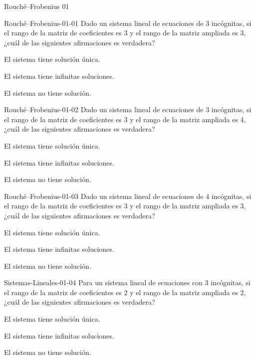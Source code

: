 \documentclass[a4,11pt]{aleph-notas}
\begin{document}
\begin{quiz}{Rouché–Frobenius 01}

\begin{multi}[]%
    {Rouché–Frobenius-01-01}
    Dado un sistema lineal de ecuaciones de 3 incógnitas, si el rango de la matriz de coeficientes es 3 y el rango de la matriz ampliada es 3, ¿cuál de las siguientes afirmaciones es verdadera?
    \item* El sistema tiene solución única.
    \item El sistema tiene infinitas soluciones.
    \item El sistema no tiene solución.
\end{multi}

\begin{multi}[]%
    {Rouché–Frobenius-01-02}
    Dado un sistema lineal de ecuaciones de 3 incógnitas, si el rango de la matriz de coeficientes es 3 y el rango de la matriz ampliada es 4, ¿cuál de las siguientes afirmaciones es verdadera?
    \item El sistema tiene solución única.
    \item El sistema tiene infinitas soluciones.
    \item* El sistema no tiene solución.
\end{multi}

\begin{multi}[]%
    {Rouché–Frobenius-01-03}
    Dado un sistema lineal de ecuaciones de 4 incógnitas, si el rango de la matriz de coeficientes es 3 y el rango de la matriz ampliada es 3, ¿cuál de las siguientes afirmaciones es verdadera?
    \item El sistema tiene solución única.
    \item* El sistema tiene infinitas soluciones.
    \item El sistema no tiene solución.
\end{multi}

\begin{multi}[]%
    {Sistemas-Lineales-01-04}
    Para un sistema lineal de ecuaciones con 3 incógnitas, si el rango de la matriz de coeficientes es 2 y el rango de la matriz ampliada es 2, ¿cuál de las siguientes afirmaciones es verdadera?
    \item El sistema tiene solución única.
    \item* El sistema tiene infinitas soluciones.
    \item El sistema no tiene solución.
\end{multi}
    

\end{quiz}
\end{document}
